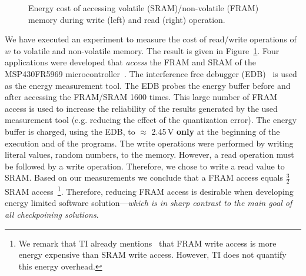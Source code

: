 \begin{figure}
	\centering
	\caption{Energy cost of accessing volatile (SRAM)/non-volatile (FRAM) memory during write (left) and read (right) operation.}
	\label{fig:framEnergy}
\end{figure}

We have executed an experiment to measure the cost of read/write operations of $w$ to volatile and non-volatile memory. The result is given in Figure~\ref{fig:framEnergy}. Four applications were developed that \emph{access} the FRAM and SRAM of the MSP430FR5969 microcontroller~\cite{msp430datasheet}. The interference free debugger (EDB)~\cite{edb} is used as the energy measurement tool. The EDB probes the energy buffer before and after accessing the FRAM/SRAM 1600 times. This large number of FRAM access is used to increase the reliability of the results generated by the used measurement tool (e.g. reducing the effect of the quantization error). The energy buffer is charged, using the EDB, to $\approx$ 2.45\,V \textbf{only} at the beginning of the execution and of the programs. The write operations were performed by writing literal values, random numbers, to the memory. However, a read operation must be followed by a write operation. Therefore, we chose to write a read value to SRAM. Based on our measurements we conclude that a FRAM access equals $\frac{3}{2}$ SRAM access~\footnote{We remark that TI already mentions~\cite{ti_fram_faq} that FRAM write access is more energy expensive than SRAM write access. However, TI does not quantify this energy overhead.}. Therefore, reducing FRAM access is desirable when developing energy limited software solution---\emph{which is in sharp contrast to the main goal of all checkpoining solutions}.

